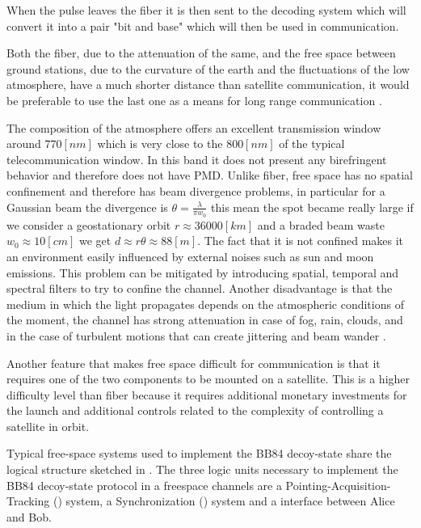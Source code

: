 When the pulse leaves the fiber it is then sent to the decoding system which will convert it into a pair "bit and base" which will then be used in communication.


Both the fiber, due to the attenuation of the same, and the free space between ground stations, due to the curvature of the earth and the fluctuations of the low atmosphere, have a much shorter distance than satellite communication, it would be preferable to use the last one as a means for long range communication \cite{a14}.

The composition of the atmosphere offers an excellent transmission window around $770 [nm]$ which is very close to the $800 [nm]$ of the typical telecommunication window. In this band it does not present any birefringent behavior and therefore does not have PMD. Unlike fiber, free space has no spatial confinement and therefore has beam divergence problems, in particular for a Gaussian beam the divergence is $\theta = \frac{\lambda}{\pi w_0}$ this mean the spot became really large if we consider a geostationary orbit $r \approx 36000[km]$ and a braded beam waste $w_0 \approx 10 [cm]$ we get $d \approx r \theta \approx 88 [m]$. The fact that it is not confined makes it an environment easily influenced by external noises such as sun and moon emissions. This problem can be mitigated by introducing spatial, temporal and spectral filters to try to confine the channel. Another disadvantage is that the medium in which the light propagates depends on the atmospheric conditions of the moment, the channel has strong attenuation in case of fog, rain, clouds, and in the case of turbulent motions that can create jittering and beam wander \cite{a25}.

Another feature that makes free space difficult for communication is that it requires one of the two components to be mounted on a satellite. This is a higher difficulty level than fiber because it requires additional monetary investments for the launch and additional controls related to the complexity of controlling a satellite in orbit.

Typical free-space systems used to implement the BB84 decoy-state share the logical structure sketched in . The three logic units necessary to implement the BB84 decoy-state protocol in a freespace channels are a Pointing-Acquisition-Tracking () system, a Synchronization () system and a  interface between Alice and Bob.


